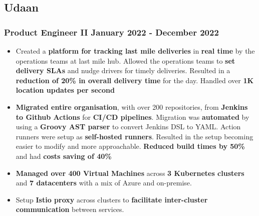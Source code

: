 \documentclass[12pt]{article}
\newcommand{\experienceItem}{\item [-] \small}
\newcommand{\spacedSubSubSection}[2]{\subsubsection {{#1} \hspace*{\fill} {#2}}}
\begin{document}
{        \subsection{Udaan}
        {
            \spacedSubSubSection{Product Engineer II}{January 2022 - December 2022}
            {
                {
                    \begin{itemize}[itemsep=0.1ex, leftmargin=6ex, rightmargin=1ex]
                        \experienceItem
                        {
                            Created a \textbf {platform for tracking last mile deliveries} in \textbf {real time} by the
                            operations teams at last mile hub. Allowed the operations teams to \textbf {set delivery SLAs} and
                            nudge drivers for timely deliveries. Resulted in a \textbf {reduction of 20\% in overall delivery time}
                            for the day. Handled over \textbf {1K location updates per second}
                        }
                        \experienceItem
                        {
                            \textbf {Migrated entire organisation}, with over 200 repositories, from \textbf {Jenkins to Github Actions}
                            for \textbf {CI/CD pipelines}. Migration was \textbf {automated} by using a \textbf {Groovy AST parser} to convert Jenkins
                            DSL to YAML. Action runners were setup as \textbf {self-hosted runners}. Resulted in the setup
                            becoming easier to modify and more approachable. \textbf {Reduced build times by 50\%} and had
                            \textbf {costs saving of 40\%}
                        }
                        \experienceItem
                        {
                            \textbf {Managed over 400 Virtual Machines} across \textbf {3 Kubernetes clusters} and
                            \textbf {7 datacenters} with a mix of Azure and on-premise.
                        }
                        \experienceItem
                        {
                            Setup \textbf {Istio proxy} across clusters to \textbf {facilitate inter-cluster communication}
                            between services.
                        }
                \end{itemize}
            }

}}}
\end{document}
